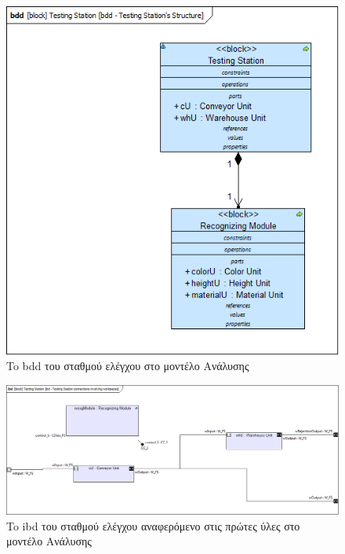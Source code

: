 \documentclass[a4paper,12pt,twoside]{report}
\begin{document}
\begin{appendices}
			\begin{figure}[hp]
					\centering
					\includegraphics[scale=0.30]{AnalysisModel_bdd-TestingStationsStructure.png}
					\caption{To bdd του σταθμού ελέγχου στο μοντέλο Ανάλυσης}
					\label{φωτ:To bdd του σταθμού ελέγχου Festo Mps στο μοντέλο Ανάλυσης}
			\end{figure}
			
			\begin{figure}[hp]
					\centering
					\includegraphics[scale=0.30]{AnalysisModel_ibd-TestingStationconnectionsinvolvingworkpieces.png}
					\caption{To ibd του σταθμού ελέγχου αναφερόμενο στις πρώτες ύλες στο μοντέλο Ανάλυσης}
					\label{φωτ:To ibd του σταθμού ελέγχου αναφερόμενο στις πρώτες ύλες στο μοντέλο Ανάλυσης}
			\end{figure}
			

\end{appendices}
\end{document}

